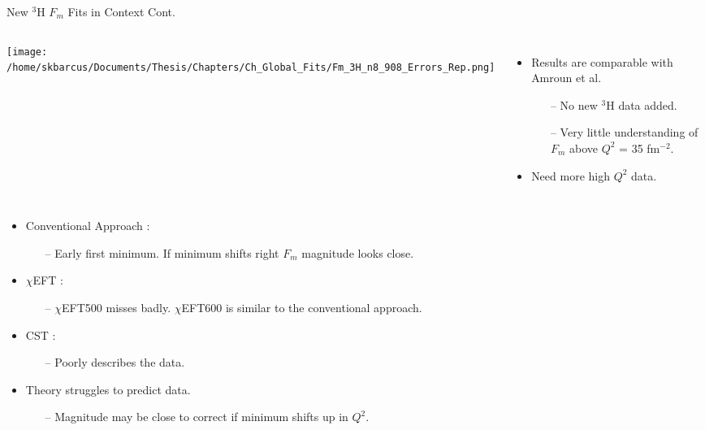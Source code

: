 \documentclass[10pt]{beamer}
\begin{document}
\begin{frame}[fragile]{New $^3$H $F_{m}$ Fits in Context Cont.}

	\begin{columns}[T,onlytextwidth]  
	
	\begin{center}
	\texttt{[image: /home/skbarcus/Documents/Thesis/Chapters/Ch\_Global\_Fits/Fm\_3H\_n8\_908\_Errors\_Rep.png]}
	\end{center}
	
	
	\begin{itemize}
		\item \alert{Results are comparable} with Amroun et al.
		\begin{itemize}
			\item[--] No new $^3$H data added.
			\item[--] \alert{Very little understanding of $F_m$ above $Q^2$ = 35 fm$^{-2}$}. 
		\end{itemize}		 
		\item {}\alert{Need more high $Q^2$ data}.
	\end{itemize}
	
	\end{columns}
	
	\begin{itemize}
		\pause
		\item \alert{Conventional Approach} \cite{Article:Marcucci}:
			\begin{itemize}
				\item[--] \alert{Early first minimum}. If minimum shifts right $F_{m}$ magnitude looks close.
			\end{itemize}
		\pause
		\item \alert{$\chi$EFT} \cite{Article:Marcucci}:
			\begin{itemize}
				\item[--] \alert{$\chi$EFT500 misses badly}. $\chi$EFT600 is similar to the conventional approach.
			\end{itemize}
		\pause
		\item \alert{CST} \cite{Article:Marcucci}:
			\begin{itemize}
				\item[--] \alert{Poorly describes the data}.
			\end{itemize}
		\pause
		\item \alert{Theory struggles to predict data}.
			\begin{itemize}
				\item[--] Magnitude may be close to correct if minimum shifts up in $Q^2$.
			\end{itemize}
	\end{itemize}

\end{frame}
\end{document}
